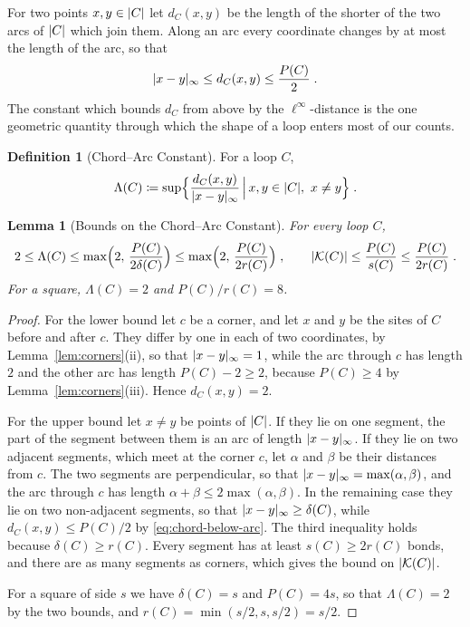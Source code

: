 \documentclass[11pt]{preprint}
\DeclarePairedDelimiter{\abs}{\lvert}{\rvert}
\numberwithin{equation}{section}
\newtheorem{lemma}[theorem]{Lemma}
\theoremstyle{definition}
\newtheorem{definition}[theorem]{Definition}
\theoremstyle{remark}
\theoremstyle{plain}
\begin{document}
For two points $x, y \in \abs{C}$ let $d_C(x, y)$ be the length of the shorter of the two arcs of $\abs{C}$ which join them. Along an arc every coordinate changes by at most the length of the arc, so that
\begin{equation}\label{eq:chord-below-arc}
    \abs{x - y}_\infty \leq d_C(x, y) \leq \frac{P(C)}{2}\;.
\end{equation}
The constant which bounds $d_C$ from above by the $\ell^\infty$-distance is the one geometric quantity through which the shape of a loop enters most of our counts.

\begin{definition}[Chord--Arc Constant]\label{def:chord-arc}
For a loop $C$,
\begin{equation}\label{eq:chord-arc-constant}
    \Lambda(C) \coloneqq \sup\Bigl\{ \frac{d_C(x, y)}{\abs{x - y}_\infty} \, \Big| \, x, y \in \abs{C},\ x \neq y \Bigr\}\;.
\end{equation}
\end{definition}

\begin{lemma}[Bounds on the Chord--Arc Constant]\label{lem:chord-arc}
For every loop $C$,
\begin{equation}\label{eq:chord-arc-bounds}
    2 \leq \Lambda(C) \leq \max\Bigl(2,\, \frac{P(C)}{2\delta(C)}\Bigr) \leq \max\Bigl(2,\, \frac{P(C)}{2r(C)}\Bigr)\;,
    \qquad
    \abs{\mathcal K(C)} \leq \frac{P(C)}{s(C)} \leq \frac{P(C)}{2r(C)}\;.
\end{equation}
For a square, $\Lambda(C) = 2$ and $P(C)/r(C) = 8$.
\end{lemma}

\begin{proof}
For the lower bound let $c$ be a corner, and let $x$ and $y$ be the sites of $C$ before and after $c$. They differ by one in each of two coordinates, by Lemma~\ref{lem:corners}(ii), so that $\abs{x - y}_\infty = 1$, while the arc through $c$ has length $2$ and the other arc has length $P(C) - 2 \geq 2$, because $P(C) \geq 4$ by Lemma~\ref{lem:corners}(iii). Hence $d_C(x, y) = 2$.

For the upper bound let $x \neq y$ be points of $\abs{C}$. If they lie on one segment, the part of the segment between them is an arc of length $\abs{x - y}_\infty$. If they lie on two adjacent segments, which meet at the corner $c$, let $\alpha$ and $\beta$ be their distances from $c$. The two segments are perpendicular, so that $\abs{x - y}_\infty = \max(\alpha, \beta)$, and the arc through $c$ has length $\alpha + \beta \leq 2\max(\alpha, \beta)$. In the remaining case they lie on two non-adjacent segments, so that $\abs{x - y}_\infty \geq \delta(C)$, while $d_C(x, y) \leq P(C)/2$ by \eqref{eq:chord-below-arc}. The third inequality holds because $\delta(C) \geq r(C)$. Every segment has at least $s(C) \geq 2r(C)$ bonds, and there are as many segments as corners, which gives the bound on $\abs{\mathcal K(C)}$.

For a square of side $s$ we have $\delta(C) = s$ and $P(C) = 4s$, so that $\Lambda(C) = 2$ by the two bounds, and $r(C) = \min(s/2, s, s/2) = s/2$.
\end{proof}
\end{document}
